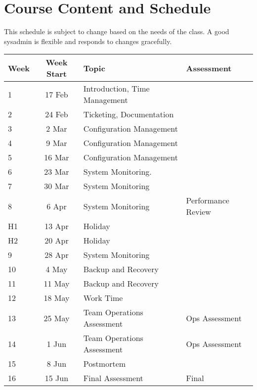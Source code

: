 \documentclass{article}
\begin{document}
\pagebreak

\section*{Course Content and Schedule}
This schedule is subject to change based on the needs of the class. A good sysadmin is flexible and responds to changes gracefully.

\renewcommand{\arraystretch}{1.5}
\begin{tabular}{|l|c|l|l|}
\hline
 Week     & Week Start & Topic                              & Assessment         \\ \hline
 1        & 17 Feb     & Introduction, Time Management      &                    \\ \hline
 2        & 24 Feb     & Ticketing, Documentation           &                    \\ \hline
 3        &  2 Mar     & Configuration Management           &                    \\ \hline
 4        &  9 Mar     & Configuration Management           &                    \\ \hline
 5        & 16 Mar     & Configuration Management           &                    \\ \hline
 6        & 23 Mar     & System Monitoring.                 &                    \\ \hline
 7        & 30 Mar     & System Monitoring                  &                    \\ \hline
 8        &  6 Apr     & System Monitoring                  & Performance Review \\ \hline
 H1       & 13 Apr     & Holiday                            &                    \\ \hline
 H2       & 20 Apr     & Holiday                            &                    \\ \hline
 9        & 28 Apr     & System Monitoring                  &                    \\ \hline
 10       &  4 May     & Backup and Recovery                &                    \\ \hline
 11       & 11 May     & Backup and Recovery                &                    \\ \hline
 12       & 18 May     & Work Time                          &                    \\ \hline
 13       & 25 May     & Team Operations Assessment         & Ops Assessment    \\ \hline
 14       &  1 Jun     & Team Operations Assessment         & Ops Assessment    \\ \hline
 15       &  8 Jun     & Postmortem                         &                    \\ \hline
 16       & 15 Jun     & Final Assessment                   & Final              \\ \hline
\end{tabular}
\end{document}
